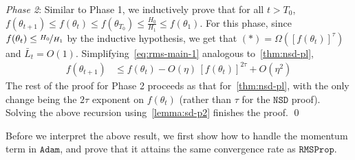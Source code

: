 \documentclass{article}
\newcommand{\tht}{\theta_t}
\newcommand{\thtt}{\theta_{t+1}}
\newcommand{\NSD}{\texttt{NSD}}
\newcommand{\RMS}{\texttt{RMSProp}}
\newcommand{\Adam}{\texttt{Adam}}
\begin{document}
\textit{Phase 2}: Similar to Phase 1, we inductively prove that for all $t > T_0$, $f(\thtt) \leq f(\tht) \leq f(\theta_{T_0}) \leq \frac{H_0}{H_1} \leq f(\theta_1)$. For this phase, since $f(\tht) \leq \nicefrac{H_0}{H_1}$ by the inductive hypothesis, we get that $(*) = \Omega([f(\tht)]^\tau)$ and $\bar{L}_t = O(1)$. Simplifying~\cref{eq:rms-main-1} analogous to~\cref{thm:nsd-pl},
\begin{align}
f(\thtt) & \leq f(\tht) - O(\eta) \, [f(\tht)]^{2\tau} + O(\eta^2) \nonumber
\end{align}
The rest of the proof for Phase 2 proceeds as that for~\cref{thm:nsd-pl}, with the only change being the $2 \tau$ exponent on $f(\tht)$ (rather than $\tau$ for the $\NSD$ proof). Solving the above recursion using~\cref{lemma:sd-p2} finishes the proof. \qed

Before we interpret the above result, we first show how to handle the momentum term in $\Adam$, and prove that it attains the same convergence rate as $\RMS$. 
\end{document}

